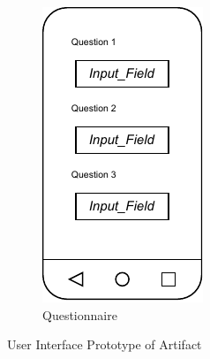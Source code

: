 \begin{figure}
\begin{subfigure}[b]{0.25\textwidth}
    \end{subfigure}
    \hspace{1cm}
    \begin{subfigure}[b]{0.25\textwidth}
        \centering
        \includegraphics[width=\textwidth]{content/05_design_and_dev_artefacts/ActivityQuestionair.drawio.pdf}
        \caption{Questionnaire}
        \label{subfig:Questionair}

    \end{subfigure}
       \caption{User Interface Prototype of Artifact}
       \label{fig:uiPrototypeArtefact}
\end{figure}

